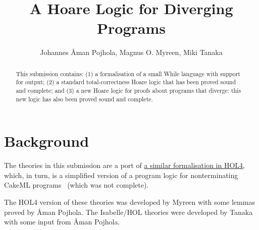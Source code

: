 \documentclass[11pt,a4paper]{article}
\begin{document}
\title{A Hoare Logic for Diverging Programs}
\author{Johannes \AA{}man Pojhola, Magnus O. Myreen, Miki Tanaka}
\maketitle

\begin{abstract}

  This submission contains:
  (1) a formalisation of a small While language with support for output;
  (2) a standard total-correctness Hoare logic that has been proved sound and complete; and
  (3) a new Hoare logic for proofs about programs that diverge: this new logic has also been proved sound and complete.

\end{abstract}

\section*{Background}

The theories in this submission are a port of
\href{https://github.com/HOL-Theorem-Prover/HOL/tree/develop/examples/Hoare-for-divergence}{a similar formalisation in HOL4},
which, in turn, is a simplified version of a program logic for nonterminating CakeML programs~\cite{ITP19} (which was not complete).

The HOL4 version of these theories was developed by Myreen with some lemmas proved by \AA{}man Pojhola.
The Isabelle/HOL theories were developed by Tanaka with some input from \AA{}man Pojhola.

\tableofcontents





\end{document}
